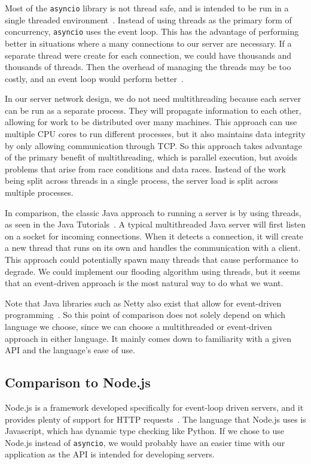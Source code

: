 \documentclass[letterpaper,twocolumn,10pt]{article}
\begin{document}
Most of the \texttt{asyncio} library is not thread safe, and is intended to be run in a single threaded environment~\cite{asynciodocs}.
Instead of using threads as the primary form of concurrency, \texttt{asyncio} uses the event loop. This has the advantage of performing
better in situations where a many connections to our server are necessary. If a separate thread were create for each connection, we could
have thousands and thousands of threads. Then the overhead of managing the threads may be too costly, and an event loop would perform
better~\cite{beazley2014}.

In our server network design, we do not need multithreading because each server can be run as a separate process. They will propagate
information to each other, allowing for work to be distributed over many machines. This approach can use multiple CPU cores to run different
processes, but it also maintains data integrity by only allowing communication through TCP. So this approach
takes advantage of the primary benefit of multithreading, which is parallel execution, but avoids problems that arise from race conditions
and data races. Instead of the work being split across threads in a single process, the server load is split across multiple processes.

In comparison, the classic Java approach to running a server is by using threads, as seen in the Java Tutorials~\cite{javadocs}. A typical
multithreaded Java server will first listen on a socket for incoming connections. When it detects a connection, it will create a new thread that
runs on its own and handles the communication with a client. This approach could potentially spawn many threads that cause performance to degrade.
We could implement our flooding algorithm using threads, but it seems that an event-driven approach is the most natural way to do what we want.

Note that Java libraries such as Netty also exist that allow for event-driven programming~\cite{nettydocs}. So this point of comparison does
not solely depend on which language we choose, since we can choose a multithreaded or event-driven approach in either language. It mainly comes
down to familiarity with a given API and the language's ease of use.

\subsection{Comparison to Node.js}

Node.js is a framework developed specifically for event-loop driven servers, and it provides plenty of support for HTTP requests~\cite{nodejsabout}.
The language that Node.js uses is Javascript, which has dynamic type checking like Python. If we chose to use Node.js instead of \texttt{asyncio},
we would probably have an easier time with our application as the API is intended for developing servers.
\end{document}
